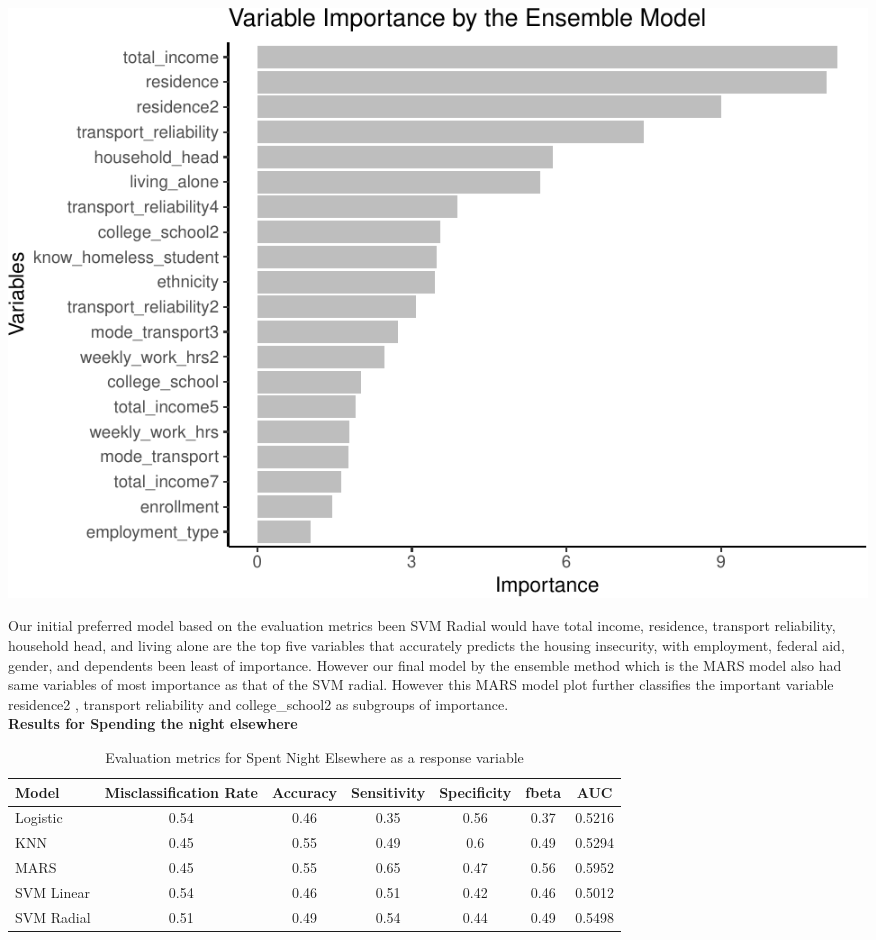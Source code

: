 \documentclass[
  10pt,
]{article}
\begin{document}
\begin{center}\includegraphics{final_phase2_report_files/figure-latex/unnamed-chunk-12-1} \end{center}

Our initial preferred model based on the evaluation metrics been SVM Radial would have total income, residence, transport reliability, household head, and living alone are the top five variables that accurately predicts the housing insecurity, with employment, federal aid, gender, and dependents been least of importance. However our final model by the ensemble method which is the MARS model also had same variables of most importance as that of the SVM radial. However this MARS model plot further classifies the important variable residence2 , transport reliability and college\_school2 as subgroups of importance.\\

\textbf{Results for Spending the night elsewhere}

\begin{table}[H]

\caption{\label{tab:unnamed-chunk-13}Evaluation metrics for Spent Night Elsewhere  as a response variable}
\centering
\fontsize{12}{14}\selectfont
\begin{tabular}[t]{lcccccc}
\toprule
Model & Misclassification Rate & Accuracy & Sensitivity & Specificity & fbeta & AUC\\
\midrule
Logistic & 0.54 & 0.46 & 0.35 & 0.56 & 0.37 & 0.5216\\
KNN & 0.45 & 0.55 & 0.49 & 0.6 & 0.49 & 0.5294\\
MARS & 0.45 & 0.55 & 0.65 & 0.47 & 0.56 & 0.5952\\
SVM Linear & 0.54 & 0.46 & 0.51 & 0.42 & 0.46 & 0.5012\\
SVM Radial & 0.51 & 0.49 & 0.54 & 0.44 & 0.49 & 0.5498\\
\bottomrule
\end{tabular}
\end{table}
\end{document}
